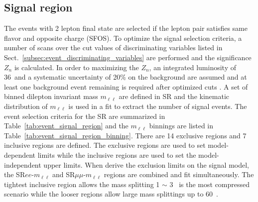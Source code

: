 
\subsection{Signal region}
\label{subsec:event_signal_region}
The events with 2 lepton final state are selected if the lepton pair satisfies same flavor and opposite charge (SFOS).
To optimize the signal selection criteria, a number of scans over the cut values of discriminating variables listed in Sect.~\ref{subsec:event_discriminating_variables} are performed and the significance $Z_{n}$ is calculated.
In order to maximizing the $Z_{n}$, an integrated luminosity of 36~\ifb and a systematic uncertainty of 20\% on the background are assumed and at least one background event remaining is required after optimized cuts . 
A set of binned dilepton invariant mass $m_{\ell \ell}$ are defined in SR and the kinematic distribution of $m_{\ell \ell}$ is used in a fit to extract the number of signal events.
The event selection criteria for the SR are summarized in Table~\ref{tab:event_signal_region} and the $m_{\ell\ell}$ binnings are listed in Table~\ref{tab:event_signal_region_binning}.
There are 14 exclusive regions and 7 inclusive regions are defined.
The exclusive regions are used to set model-dependent limits while the inclusive regions are used to set the model-independent upper limits.
When derive the exclusion limits on the signal model, the SR$ee$-$m_{\ell\ell}$ and SR$\mu\mu$-$m_{\ell\ell}$ regions are combined and fit simultaneously.
The tightest inclusive region allows the mass splitting 1 $\sim$ 3~{\GeV} is the most compressed scenario while the looser regions allow large mass splittings up to 60~{\GeV}.

